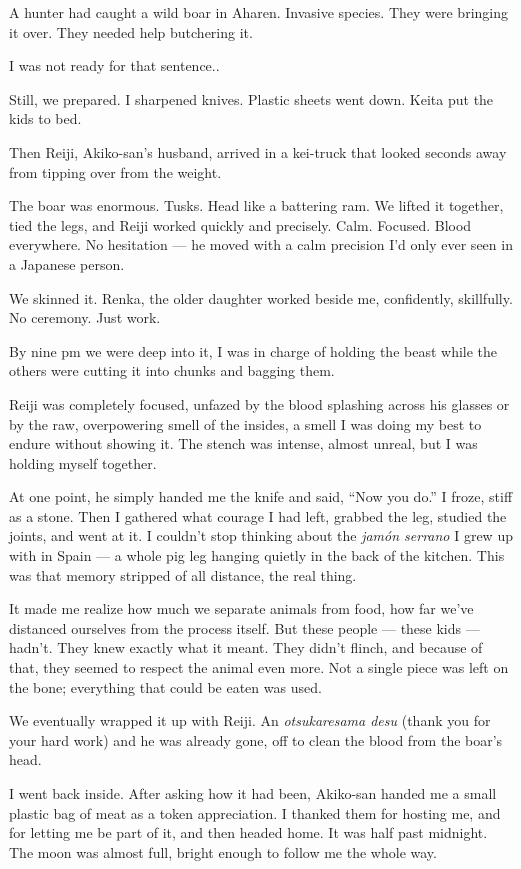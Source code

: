\documentclass[
  letterpaper,
  oneside]{scrbook}
\begin{document}
A hunter had caught a wild boar in Aharen. Invasive species. They were
bringing it over. They needed help butchering it.

I was not ready for that sentence..

Still, we prepared. I sharpened knives. Plastic sheets went down. Keita
put the kids to bed.

Then Reiji, Akiko-san's husband, arrived in a kei-truck that looked
seconds away from tipping over from the weight.

The boar was enormous. Tusks. Head like a battering ram. We lifted it
together, tied the legs, and Reiji worked quickly and precisely. Calm.
Focused. Blood everywhere. No hesitation --- he moved with a calm
precision I'd only ever seen in a Japanese person.

We skinned it. Renka, the older daughter worked beside me, confidently,
skillfully. No ceremony. Just work.

By nine pm we were deep into it, I was in charge of holding the beast
while the others were cutting it into chunks and bagging them.

Reiji was completely focused, unfazed by the blood splashing across his
glasses or by the raw, overpowering smell of the insides, a smell I was
doing my best to endure without showing it. The stench was intense,
almost unreal, but I was holding myself together.

At one point, he simply handed me the knife and said, ``Now you do.'' I
froze, stiff as a stone. Then I gathered what courage I had left,
grabbed the leg, studied the joints, and went at it. I couldn't stop
thinking about the \emph{jamón serrano} I grew up with in Spain --- a
whole pig leg hanging quietly in the back of the kitchen. This was that
memory stripped of all distance, the real thing.

It made me realize how much we separate animals from food, how far we've
distanced ourselves from the process itself. But these people --- these
kids --- hadn't. They knew exactly what it meant. They didn't flinch,
and because of that, they seemed to respect the animal even more. Not a
single piece was left on the bone; everything that could be eaten was
used.

We eventually wrapped it up with Reiji. An \emph{otsukaresama desu}
(thank you for your hard work) and he was already gone, off to clean the
blood from the boar's head.

I went back inside. After asking how it had been, Akiko-san handed me a
small plastic bag of meat as a token appreciation. I thanked them for
hosting me, and for letting me be part of it, and then headed home. It
was half past midnight. The moon was almost full, bright enough to
follow me the whole way.
\end{document}
